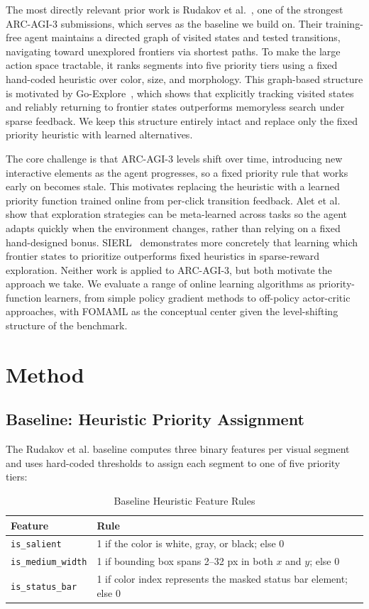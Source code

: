 \documentclass{article}
\begin{document}
The most directly relevant prior work is Rudakov et al.~\cite{rudakov2025graph}, one of the strongest ARC-AGI-3 submissions, which serves as the baseline we build on. Their training-free agent maintains a directed graph of visited states and tested transitions, navigating toward unexplored frontiers via shortest paths. To make the large action space tractable, it ranks segments into five priority tiers using a fixed hand-coded heuristic over color, size, and morphology. This graph-based structure is motivated by Go-Explore~\cite{ecoffet2021first}, which shows that explicitly tracking visited states and reliably returning to frontier states outperforms memoryless search under sparse feedback. We keep this structure entirely intact and replace only the fixed priority heuristic with learned alternatives.

The core challenge is that ARC-AGI-3 levels shift over time, introducing new interactive elements as the agent progresses, so a fixed priority rule that works early on becomes stale. This motivates replacing the heuristic with a learned priority function trained online from per-click transition feedback. Alet et al.~\cite{alet2020metalearning} show that exploration strategies can be meta-learned across tasks so the agent adapts quickly when the environment changes, rather than relying on a fixed hand-designed bonus. SIERL~\cite{sierl2026} demonstrates more concretely that learning which frontier states to prioritize outperforms fixed heuristics in sparse-reward exploration. Neither work is applied to ARC-AGI-3, but both motivate the approach we take. We evaluate a range of online learning algorithms as priority-function learners, from simple policy gradient methods to off-policy actor-critic approaches, with FOMAML as the conceptual center given the level-shifting structure of the benchmark.

\section{Method}
\subsection{Baseline: Heuristic Priority Assignment}

The Rudakov et al. baseline computes three binary features per visual segment and uses hard-coded thresholds to assign each segment to one of five priority tiers:

\begin{table}[h]
\centering
\caption{Baseline Heuristic Feature Rules}
\label{tab:baseline_features}
\begin{tabular}{ll}
\toprule
\textbf{Feature} & \textbf{Rule} \\
\midrule
\texttt{is\_salient} & 1 if the color is white, gray, or black; else 0 \\
\texttt{is\_medium\_width} & 1 if bounding box spans 2--32 px in both $x$ and $y$; else 0 \\
\texttt{is\_status\_bar} & 1 if color index represents the masked status bar element; else 0 \\
\bottomrule
\end{tabular}
\end{table}
\end{document}
